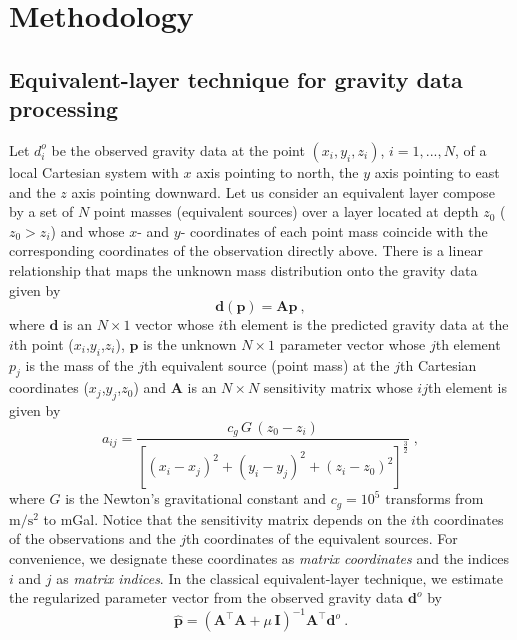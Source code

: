 \documentclass[manuscript,revised]{geophysics}
\begin{document}
\section*{Methodology}

\subsection{Equivalent-layer technique for gravity data processing}

Let $d^{o}_{i}$ be the observed gravity data at
the point $(x_{i}, y_{i}, z_{i})$, $i = 1, ..., N$, of a local Cartesian
system with $x$ axis pointing to north, the $y$ axis pointing to east and 
the $z$ axis pointing downward.
Let us consider an equivalent layer compose by a set of $N$ point masses 
(equivalent sources) over a layer located at depth $z_0$ ($z_0 >z_i$) and whose 
$x$- and $y$- coordinates of each point mass coincide with the corresponding coordinates 
of the observation directly above.
There is a linear relationship that maps the unknown mass distribution onto the gravity 
data given by
\begin{equation}
\mathbf{d}(\mathbf{p}) = \mathbf{A} \mathbf{p} \: ,
\label{eq:predicted-data-vector}
\end{equation}
where $\mathbf{d}$ is an $N \times 1$ vector whose $i$th element is the predicted gravity 
data at the $i$th point ($x_i$,$y_i$,$z_i$), $\mathbf{p}$ is the unknown $N \times 1$ 
parameter vector whose $j$th element $p_j$  is the mass of the $j$th equivalent source 
(point mass) at the $j$th Cartesian coordinates ($x_j$,$y_j$,$z_0$) and $\mathbf{A}$ 
is an $N \times N$  sensitivity matrix whose $ij$th element is given by 
\begin{equation}
a_{ij}= \frac{c_{g} \, G \, (z_{0} - z_{i})}{\left[(x_{i} - x_{j})^{2} +
(y_{i} - y_{j})^{2} +	(z_{i} - z_{0})^{2} \right]^{\frac{3}{2}}} \; ,
\label{eq:aij}
\end{equation}
where $G$ is the Newton's gravitational constant and $c_{g} = 10^{5}$ 
transforms from $\mathrm{m/s^2}$ to mGal.
Notice that the sensitivity matrix depends on the $i$th coordinates of the observations 
and the $j$th coordinates of the equivalent sources. For convenience, we designate 
these coordinates as \textit{matrix coordinates} and the indices $i$ and $j$ as 
\textit{matrix indices}.
In the classical equivalent-layer technique, we estimate the regularized parameter vector 
from the observed gravity data $\mathbf{d}^{o}$ by
\begin{equation}
\hat{\mathbf{p}} = \left( \mathbf{A}^{\top}\mathbf{A} + 
\mu \, \mathbf{I} \right)^{-1}
\mathbf{A}^{\top} \mathbf{d}^{o} \: .
\label{eq:estimated-p-parameter-space}
\end{equation}
\end{document}
